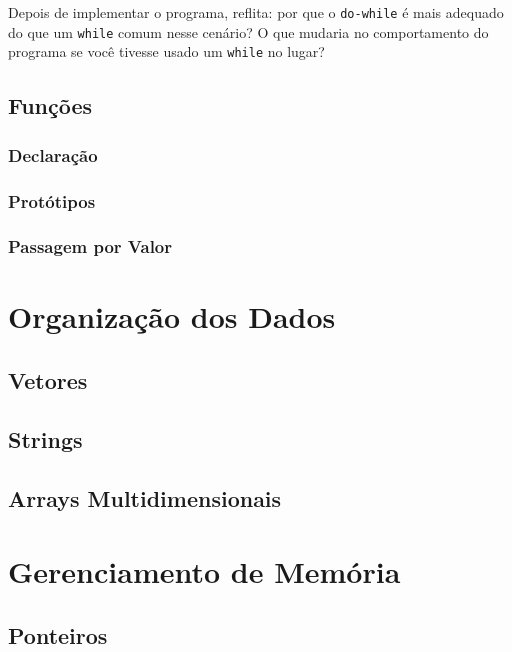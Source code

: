 \documentclass[12pt,a4paper,oneside]{extreport}
\begin{document}
Depois de implementar o programa, reflita: por que o \texttt{do-while} é mais adequado do que um \texttt{while} comum nesse cenário? O que mudaria no comportamento do programa se você tivesse usado um \texttt{while} no lugar?

\chapter{Funções}

\section{Declaração}

\section{Protótipos}

\section{Passagem por Valor}



\part{Organização dos Dados}

\chapter{Vetores}

\chapter{Strings}

\chapter{Arrays Multidimensionais}


\part{Gerenciamento de Memória}


\chapter{Ponteiros}
\end{document}
